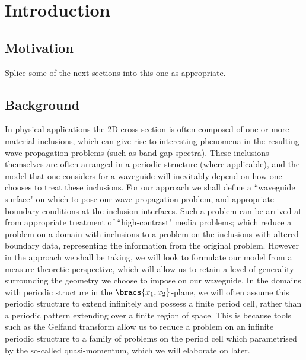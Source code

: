 \chapter{Introduction} \label{ch:1Intro}

\section{Motivation}
Splice some of the next sections into this one as appropriate.

\section{Background}
In physical applications the 2D cross section is often composed of one or more material inclusions, which can give rise to interesting phenomena in the resulting wave propagation problems (such as band-gap spectra).
These inclusions themselves are often arranged in a periodic structure (where applicable), and the model that one considers for a waveguide will inevitably depend on how one chooses to treat these inclusions.
For our approach we shall define a ``waveguide surface" on which to pose our wave propagation problem, and appropriate boundary conditions at the inclusion interfaces.
Such a problem can be arrived at from appropriate treatment of ``high-contrast" media problems; which reduce a problem on a domain with inclusions to a problem on the inclusions with altered boundary data, representing the information from the original problem.
However in the approach we shall be taking, we will look to formulate our model from a measure-theoretic perspective, which will allow us to retain a level of generality surrounding the geometry we choose to impose on our waveguide. 
In the domains with periodic structure in the $\bracs{x_1,x_2}$-plane, we will often assume this periodic structure to extend infinitely and possess a finite period cell, rather than a periodic pattern extending over a finite region of space.
This is because tools such as the Gelfand transform allow us to reduce a problem on an infinite periodic structure to a family of problems on the period cell which parametrised by the so-called quasi-momentum, which we will elaborate on later.

